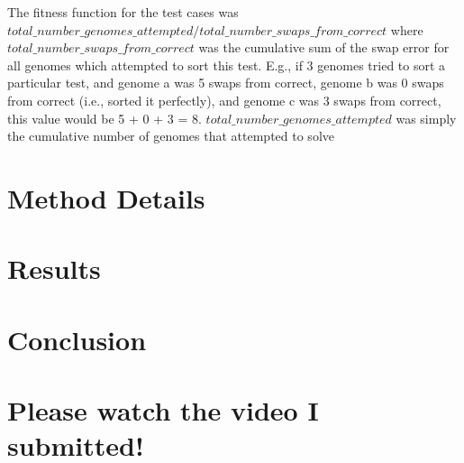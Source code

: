 \documentclass[9pt]{article}
\begin{document}
The fitness function for the test cases was $total\_number\_genomes\_attempted/total\_number\_swaps\_from\_correct$ where $total\_number\_swaps\_from\_correct$ was the cumulative sum of the swap error for all genomes which attempted to sort this test. E.g., if 3 genomes tried to sort a particular test, and genome a was 5 swaps from correct, genome b was 0 swaps from correct (i.e., sorted it perfectly), and genome c was 3 swaps from correct, this value would be 5 + 0 + 3 = 8. $total\_number\_genomes\_attempted$ was simply the cumulative number of genomes that attempted to solve 
  
   
\vspace{5mm}
\section{Method Details}



\section{Results}


\section{Conclusion}

\section{Please watch the video I submitted!}
\end{document}
